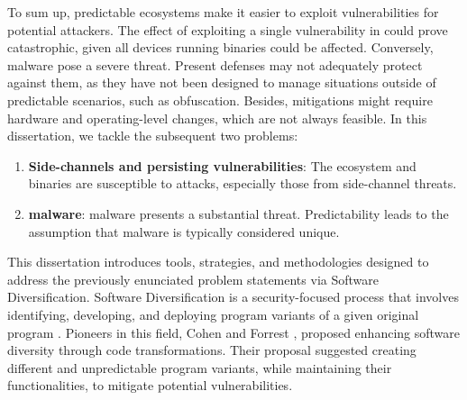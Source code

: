 
To sum up, predictable ecosystems make it easier to exploit vulnerabilities for potential attackers. 
The effect of exploiting a single vulnerability in \Wasm could prove catastrophic, given all devices running \Wasm binaries could be affected. 
Conversely, \Wasm malware pose a severe threat. 
Present defenses may not adequately protect against them, as they have not been designed to manage situations outside of predictable scenarios, such as obfuscation. 
Besides, mitigations might require hardware and operating-level changes, which are not always feasible.
In this dissertation, we tackle the subsequent two problems:

\begin{enumerate}[label=\textbf{P\arabic*}, ref=\textbf{P\arabic*}]

	\item \label{prob4} \textbf{Side-channels and persisting vulnerabilities}: The \Wasm ecosystem and binaries are susceptible to attacks, especially those from side-channel threats.
	
	\item \label{prob5} \textbf{\Wasm malware}: 
	\Wasm malware presents a substantial threat.
	Predictability leads to the assumption that malware is typically considered unique.

\end{enumerate}


\begin{comment}
\msection{Problem statement}

\end{comment}


This dissertation introduces tools, strategies, and methodologies designed to address the previously enunciated problem statements via Software Diversification.
Software Diversification is a security-focused process that involves identifying, developing, and deploying program variants of a given original program \cite{okhravi2013survey}.
Pioneers in this field, Cohen \etal \cite{cohen1993operating} and Forrest \etal \cite{595185}, proposed enhancing software diversity through code transformations. 
Their proposal suggested creating different and unpredictable program variants, while maintaining their functionalities, to mitigate potential vulnerabilities.



